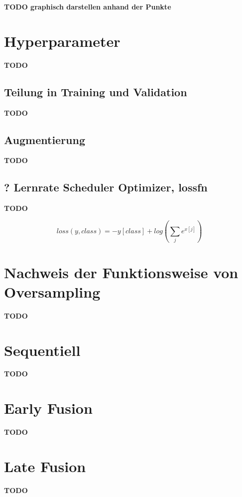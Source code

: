 \textbf{TODO graphisch darstellen anhand der Punkte}


\clearpage
\section{Hyperparameter}\label{hyper}
\textbf{TODO}

\subsection{Teilung in Training und Validation}\label{split}
\textbf{TODO}

\subsection{Augmentierung}\label{augmentation}
\textbf{TODO}

\subsection{? Lernrate Scheduler Optimizer, lossfn}\label{lrate}
\textbf{TODO}

\begin{equation}
 loss(y, class) = - y[class] + log( \sum_{j}^{} e^{x[j]} )
\end{equation}

\section{Nachweis der Funktionsweise von Oversampling}\label{oversampling}
\textbf{TODO}


\section{Sequentiell}\label{sequent}
\textbf{TODO}

\section{Early Fusion}\label{earlyfusion}
\textbf{TODO}

\section{Late Fusion}\label{latefusion}
\textbf{TODO}










